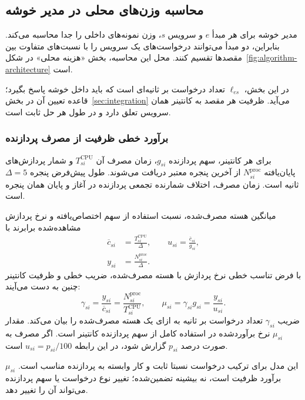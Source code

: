 \subsection{محاسبه وزن‌های محلی در مدیر خوشه}
\label{sec:cluster-manager}

مدیر خوشه برای هر مبدأ $e$ و سرویس $s$، وزن نمونه‌های داخلی را جدا محاسبه می‌کند. بنابراین، دو مبدأ می‌توانند درخواست‌های یک سرویس را با نسبت‌های متفاوت بین مقصدها تقسیم کنند. محل این محاسبه، بخش «هزینه محلی» در شکل~\ref{fig:algorithm-architecture} است.

در این بخش، $\ell_{es}$ تعداد درخواست بر ثانیه‌ای است که باید داخل خوشه پاسخ بگیرد؛ قاعده تعیین آن در بخش~\ref{sec:integration} می‌آید. ظرفیت هر مقصد به کانتینر همان سرویس تعلق دارد و در طول هر حل ثابت است.

\subsubsection{برآورد خطی ظرفیت از مصرف پردازنده}

برای هر کانتینر، سهم پردازنده $g_{si}$، زمان مصرف آن $T^{\mathrm{CPU}}_{si}$ و شمار پردازش‌های پایان‌یافته $N^{\mathrm{proc}}_{si}$ از آخرین پنجره معتبر دریافت می‌شوند. طول پیش‌فرض پنجره $\Delta=5$ ثانیه است. زمان مصرف، اختلاف شمارنده تجمعی پردازنده در آغاز و پایان همان پنجره است.

میانگین هسته مصرف‌شده، نسبت استفاده از سهم اختصاص‌یافته و نرخ پردازش مشاهده‌شده برابرند با
\begin{align}
 \overline c_{si}&=\frac{T^{\mathrm{CPU}}_{si}}{\Delta},\qquad
 u_{si}=\frac{\overline c_{si}}{g_{si}},
 \label{eq:container-utilization}\\
 y_{si}&=\frac{N^{\mathrm{proc}}_{si}}{\Delta}.
 \label{eq:processed-throughput}
\end{align}
با فرض تناسب خطی نرخ پردازش با هسته مصرف‌شده، ضریب خطی و ظرفیت کانتینر چنین به دست می‌آیند:
\begin{equation}
 \gamma_{si}=\frac{y_{si}}{\overline c_{si}}
            =\frac{N^{\mathrm{proc}}_{si}}{T^{\mathrm{CPU}}_{si}},\qquad
 \mu_{si}=\gamma_{si}g_{si}=\frac{y_{si}}{u_{si}}.
 \label{eq:cpu-linear-capacity}
\end{equation}
ضریب $\gamma_{si}$ تعداد درخواست بر ثانیه به ازای یک هسته مصرف‌شده را بیان می‌کند. مقدار $\mu_{si}$ نرخ برآوردشده در استفاده کامل از سهم پردازنده کانتینر است. اگر مصرف به صورت درصد $p_{si}$ گزارش شود، در این رابطه $u_{si}=p_{si}/100$ است.

این مدل برای ترکیب درخواست نسبتا ثابت و کار وابسته به پردازنده مناسب است. $\mu_{si}$ برآورد ظرفیت است، نه بیشینه تضمین‌شده؛ تغییر نوع درخواست یا سهم پردازنده می‌تواند آن را تغییر دهد.

